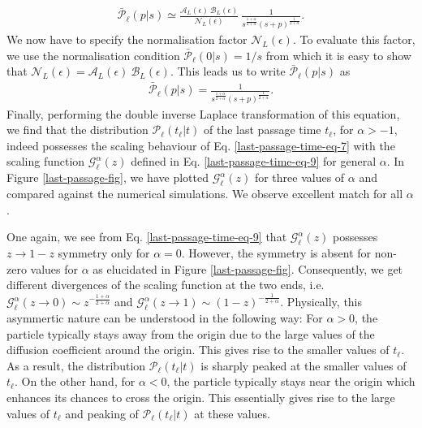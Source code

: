\documentclass[showpacs,amsmath,amssymb,aps,pre,twocolumn,]{revtex4-1}
\def\greenw#1{{\color{black} #1}}
\begin{document}
\begin{align}
\bar{\mathcal{P}}_{ \ell } \left( p|s \right) \simeq \frac{\mathcal{A}_L (\epsilon)~\mathcal{B}_L (\epsilon)}{\mathcal{N}_L(\epsilon)}~\frac{1}{s^{\frac{1+\alpha}{2+\alpha}} \left(s+p \right)^{\frac{1}{2+\alpha}}}.
\label{last-passage-time-eq-5}
\end{align}
We now have to specify the normalisation factor $\mathcal{N}_L(\epsilon)$. To evaluate this factor, we use the normalisation condition $\bar{\mathcal{P}}_{ \ell } \left( 0|s \right) = 1/s $ from which it is easy to show that $\mathcal{N}_L(\epsilon) =\mathcal{A}_L (\epsilon)~\mathcal{B}_L (\epsilon)$. This leads us to write $\bar{\mathcal{P}}_{ \ell } \left( p|s \right)$ as
\begin{align}
\bar{\mathcal{P}}_{ \ell } \left( p|s \right)= \frac{1}{s^{\frac{1+\alpha}{2+\alpha}} \left(s+p \right)^{\frac{1}{2+\alpha}}}.
\label{last-passage-time-eq-6}
\end{align}
\greenw{Finally, performing the double inverse Laplace transformation of this equation, we find that the distribution $\mathcal{P}_{ \ell } \left( t_{\ell}|t \right)$ of the last passage time $t_{\ell}$, for $\alpha >-1$, indeed possesses the scaling behaviour of Eq. \eqref{last-passage-time-eq-7} with the scaling function $\mathcal{G}_{\ell}^{\alpha}(z)$ defined in  Eq. \eqref{last-passage-time-eq-9} for general $\alpha$.} In Figure \ref{last-passage-fig}, we have plotted $\mathcal{G}_{\ell}^{\alpha}(z)$ for three values of $\alpha$ and compared against the numerical simulations. We observe excellent match for all $\alpha$.

One again, we see from Eq. \eqref{last-passage-time-eq-9} that $\mathcal{G}_{\ell}^{\alpha}(z)$ possesses $z \to 1-z$ symmetry only for $\alpha =0$. However, the symmetry is absent for non-zero values for  $\alpha$ as elucidated in Figure \ref{last-passage-fig}. Consequently, we get different divergences of the scaling function at the two ends, i.e.  $\mathcal{G} _{\ell }^{\alpha} \left( z \to 0 \right) \sim z^{-\frac{1+\alpha}{2+\alpha}}$ and $\mathcal{G} _{ \ell }^{\alpha} \left( z \to 1 \right) \sim (1-z)^{-\frac{1}{2+\alpha}}$. Physically, this asymmertic nature can be understood in the following way: For $ \alpha >0 $, the particle typically stays away from the origin due to the large values of the diffusion coefficient around the origin. This gives rise to the smaller values of $t_{ \ell }$. As a result, the distribution $\mathcal{P}_{ \ell } \left( t_{\ell}|t \right)$ is sharply peaked at the smaller values of $t_{\ell}$. On the other hand, for $\alpha <0$, the particle typically stays near the origin which enhances its chances to cross the origin. This essentially gives rise to the large values of $t_{\ell}$ and peaking of $\mathcal{P}_{ \ell } \left( t_{\ell}|t \right)$ at these values.  
  
\end{document}
